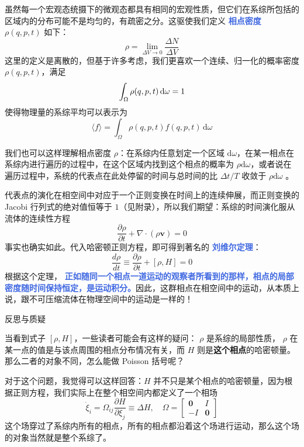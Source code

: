 \documentclass[hyperref,UTF-8]{ctexart}
\newcommand{\0}{\boldsymbol{0}}
\begin{document}
虽然每一个宏观态统摄下的微观态都具有相同的宏观性质，但它们在系综所包括的区域内的分布可能不是均匀的，有疏密之分。这驱使我们定义 \textcolor{RoyalBlue}{\textbf{\kaishu 相点密度}} $\rho(q,p,t)$ 如下：
\begin{equation}
    \rho = \lim_{\Delta V\rightarrow 0} \frac{\Delta N}{\Delta V} 
\end{equation}
这里的定义是离散的，但基于许多考虑，我们更喜欢一个连续、归一化的概率密度 $\rho(q,p,t)$，满足
\begin{equation}
    \int_\Omega \rho(q,p,t)\,\mathrm{d}\omega = 1 \\
\end{equation}
使得物理量的系综平均可以表示为
\begin{equation}
    \langle f \rangle =  \int_\Omega \rho(q,p,t)f(q,p,t)\,\mathrm{d}\omega
\end{equation}

我们也可以这样理解相点密度 $\rho$：在系综内任意划定一个区域 $\mathrm{d} \omega$，在某一相点在系综内进行遍历的过程中，在这个区域内找到这个相点的概率为 $\rho \mathrm{d} \omega$，或者说在遍历过程中，系统的代表点在此处停留的时间与总时间的比 $\Delta t / T$  收敛于 $\rho \mathrm{d} \omega$ 。

代表点的演化在相空间中对应于一个正则变换在时间上的连续伸展\cite{liang}，而正则变换的Jacobi 行列式的绝对值恒等于 $1$（见附录），所以我们期望：系综的时间演化服从流体的连续性方程
\begin{equation}
    \frac{\partial \rho}{\partial t} + \nabla \cdot (\rho \bm{v}) = 0
\end{equation}
事实也确实如此。代入哈密顿正则方程，即可得到著名的 \textcolor{RoyalBlue}{\textbf{\kaishu 刘维尔定理}}：
\begin{equation}
    \frac{d \rho}{dt} \equiv \frac{\partial \rho}{\partial t} + [\rho ,H] = 0
\end{equation}
根据这个定理， \textcolor{RoyalBlue}{\textbf{\kaishu 正如随同一个相点一道运动的观察者所看到的那样，相点的局部密度随时间保持恒定，是运动积分。}}因此，这群相点在相空间中的运动，从本质上说，跟不可压缩流体在物理空间中的运动是一样的！

\begin{justification}{\kaishu 反思与质疑}
    \kaishu \fontsize{11pt}{16pt}
    
    \quad\quad 当看到式子 $[\rho , H]$，一些读者可能会有这样的疑问： $\rho$ 是系综的局部性质， $\rho$ 在某一点的值是与该点周围的相点分布情况有关，而 $H$ 则是\textbf{这个相点}的哈密顿量。那么二者的对象不同，怎么能做 Poisson 括号呢？
    
    \quad\quad 对于这个问题，我觉得可以这样回答：$H$ 并不只是某个相点的哈密顿量，因为根据正则方程，我们实际上在整个相空间内都定义了一个相场\cite{pan}
    \[
        \dot\xi_i = \Omega_{ij}\frac{\partial H}{\partial \xi_j} \equiv \Delta H,\quad \Omega =
        \begin{bmatrix}
            \bm{0} & I\\
            -I& \bm{0}
        \end{bmatrix}
    \]
    这个场穿过了系综内所有的相点，所有的相点都沿着这个场进行运动，那么这个场的对象当然就是整个系综了。
    \end{justification}
\end{document}
